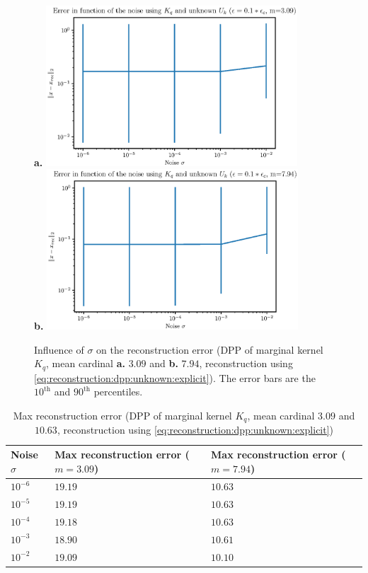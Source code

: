 \documentclass{article}
\begin{document}
\begin{figure}[ht]
\centering
\textbf{a.} \includegraphics[height=6cm]{error_function_noise_Kq_unknown_Uk_m_3.eps} \\
\textbf{b.} \includegraphics[height=6cm]{error_function_noise_Kq_unknown_Uk_m_8.eps}
\caption{Influence of $\sigma$ on the reconstruction error (DPP of marginal kernel $K_q$, mean cardinal \textbf{a.} $3.09$ and \textbf{b.} $7.94$, reconstruction using \eqref{eq:reconstruction:dpp:unknown:explicit}). The error bars are the $10^\text{th}$ and $90^\text{th}$ percentiles.} \label{fig:Kq:recerror:unknownUk}
\end{figure}


\begin{table}[ht]
  \caption{Max reconstruction error (DPP of marginal kernel $K_q$, mean cardinal $3.09$ and $10.63$, reconstruction using \eqref{eq:reconstruction:dpp:unknown:explicit})}
  \label{tab:Kq:maxrecerror:unknownUk}
  \centering
  \begin{tabular}{lll}
    \toprule
    Noise $\sigma$ &  Max reconstruction error ($m=3.09$) &  Max reconstruction error ($m=7.94$) \\
    \midrule
    $10^{-6}$ & $19.19$ & $10.63$\\
    $10^{-5}$ & $19.19$ & $10.63$\\
    $10^{-4}$ & $19.18$ & $10.63$\\
		$10^{-3}$ & $18.90$ & $10.61$\\
		$10^{-2}$ & $19.09$ & $10.10$\\
    \bottomrule
  \end{tabular}
\end{table}
\end{document}
